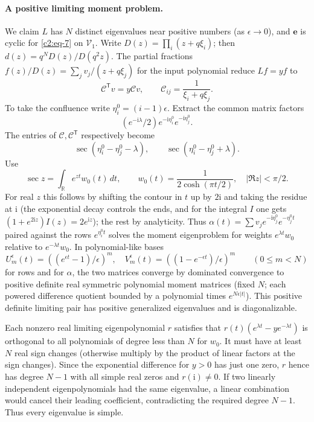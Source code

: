 \paragraph{A positive limiting moment problem.}
We claim $L$ has \(N\) distinct eigenvalues near positive numbers (as \(\epsilon\to0\)), and \(\mathbf e\) is cyclic for \eqref{c2:eq-7} on \(\mathcal V_1\). Write \(D(z)=\prod_i(z+q\xi_i)\); then \(d(z)=q^N D(z)/D(q^2 z)\). The partial fractions \(f(z)/D(z)=\sum_j v_j/(z+q\xi_j)\) for the input polynomial reduce \(L f=y f\) to
\[
 \mathcal C^\mathsf{T} v=y\mathcal C v,\qquad
 \mathcal C_{ij}=\frac1{\xi_i+q\xi_j}.
\]
To take the confluence write \(\eta_i^0=(i-1)\epsilon\). Extract the common matrix factors
\[
 (e^{-\mathrm i\lambda}/2)e^{-\mathrm i\eta_i^0}e^{-\mathrm i\eta_j^0}.
\]
The entries of \(\mathcal C,\mathcal C^\mathsf{T}\) respectively become
\[
 \sec(\eta_i^0-\eta_j^0-\lambda),\qquad
 \sec(\eta_i^0-\eta_j^0+\lambda).
\]
Use
\begin{equation}
 \sec z=\int_{\mathbb R} e^{z t}w_0(t)\,dt,\qquad w_0(t)=\frac1{2\cosh(\pi t/2)},\quad |\Re z|<\pi/2.       \label{c2:eq-8}
\end{equation}
For real \(z\) this follows by shifting the contour in \(t\) up by \(2\mathrm i\) and taking the residue at \(\mathrm i\) (the exponential decay controls the ends, and for the integral \(I\) one gets \((1+e^{2\mathrm i z})I(z)=2e^{\mathrm i z}\)); the rest by analyticity. Thus \(\alpha(t)=\sum v_j e^{-\mathrm i\eta_j^0}e^{-\eta_j^0 t}\) paired against the rows \(e^{\eta_i^0 t}\) solves the moment eigenproblem for weights \(e^{\lambda t} w_0\) relative to \(e^{-\lambda t} w_0\). In polynomial-like bases
\[
 U_m^\epsilon(t)=((e^{\epsilon t}-1)/\epsilon)^m,\quad V_m^\epsilon(t)=((1-e^{-\epsilon t})/\epsilon)^m
 \qquad(0\le m<N)
\]
for rows and for \(\alpha\), the two matrices converge by dominated convergence to positive definite real symmetric polynomial moment matrices (fixed \(N\); each powered difference quotient bounded by a polynomial times \(e^{N\epsilon |t|}\)). This positive definite limiting pair has positive generalized eigenvalues
and is diagonalizable.

Each nonzero real limiting eigenpolynomial \(r\) satisfies that \(r(t)(e^{\lambda t}-y e^{-\lambda t})\) is orthogonal to all polynomials of degree less than \(N\) for \(w_0\). It must have at least \(N\) real sign changes (otherwise multiply by the product of linear factors at the sign changes). Since the exponential difference for \(y>0\) has just one zero, \(r\) hence has degree \(N-1\) with all simple real zeros and \(r(\mathrm i)\ne0\). If two linearly independent eigenpolynomials had the same eigenvalue,
a linear combination would cancel their leading coefficient, contradicting
the required degree $N-1$.  Thus every eigenvalue is simple.

